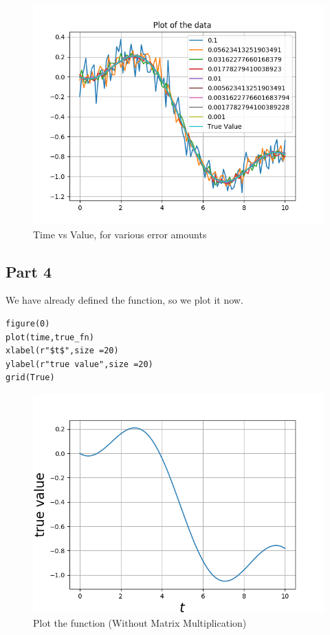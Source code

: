 \documentclass[11pt, a4paper]{article}
\begin{document}
\begin{figure}[!tbh]
   	\centering
   	\includegraphics[scale=0.5]{Assignment_3_Qn3.png}
   	\caption{Time vs Value, for various error amounts}
   	\label{fig:allgraphs}
   \end{figure} 

 \subsection{Part 4}
 We have already defined the function, so we plot it now.
 \begin{verbatim}
figure(0)
plot(time,true_fn)
xlabel(r"$t$",size =20)
ylabel(r"true value",size =20)
grid(True)
\end{verbatim}
\begin{figure}[!tbh]
   	\centering
   	\includegraphics[scale=0.5]{Assignment_3_Qn4.png}
   	\caption{Plot the function (Without Matrix Multiplication)}
   	\label{fig:trueNoMatrix}
   \end{figure}
   
\end{document}
